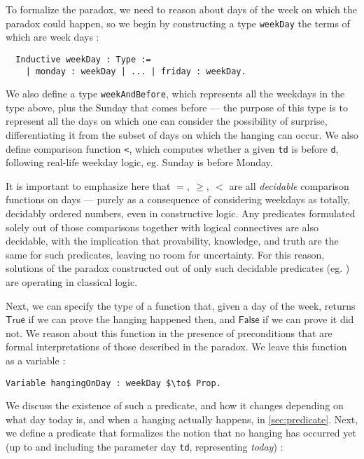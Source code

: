 \documentclass[runningheads]{llncs}
\begin{document}
To formalize the paradox, we need to reason about days of the week on which
the paradox could happen, so we
begin by constructing a type {\tt weekDay} the terms of which are week days :

\begin{lstlisting}
  Inductive weekDay : Type :=
    | monday : weekDay | ... | friday : weekDay.
\end{lstlisting}

We also define a type {\tt weekAndBefore}, which represents all the weekdays in
the type above, plus the Sunday that comes before --- the purpose of this type is to
represent all the days on which one can consider the possibility of surprise,
differentiating it from the subset of days on which the hanging can occur. We
also define comparison function {\tt <}, which computes
whether a given {\tt td} is before {\tt d},
following real-life weekday logic, eg. Sunday is before Monday.

It is important to emphasize here that $=,~\geq,~<$ are all \emph{decidable}
comparison functions on days --- purely as a consequence of considering weekdays
as totally, decidably ordered numbers, even in constructive logic. Any predicates
formulated solely out of those comparisons together with logical connectives are also decidable,
with the implication that provability, knowledge, and truth are the same for such predicates,
leaving no room for uncertainty.
For this reason, solutions of the paradox constructed out of only such decidable predicates (eg. \cite{godelinconsistent})
are operating in classical logic.

Next, we can specify the type of a
function that, given a day of the week, returns $\mathsf{True}$ if we can prove the hanging
happened then, and $\mathsf{False}$ if we can prove it did not. We reason about this function
in the presence of preconditions that are formal interpretations of those described
in the paradox. We leave this function as a variable :

\begin{lstlisting}[mathescape=true]
  Variable hangingOnDay : weekDay $\to$ Prop.
\end{lstlisting}

We discuss the existence of such a predicate, and how it changes depending
on what day today is, and when a hanging actually happens, in \ref{sec:predicate}.
Next, we define a predicate that formalizes the notion that no hanging has occurred
yet (up to and including the parameter day {\tt td}, representing \emph{today}) :
\end{document}
